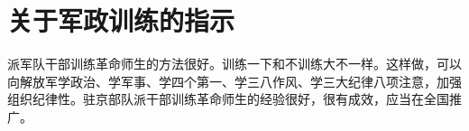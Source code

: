 \section[关于军政训练的指示（一九六六年十二月三十一日）]{关于军政训练的指示}


派军队干部训练革命师生的方法很好。训练一下和不训练大不一样。这样做，可以向解放军学政治、学军事、学四个第一、学三八作风、学三大纪律八项注意，加强组织纪律性。驻京部队派干部训练革命师生的经验很好，很有成效，应当在全国推广。


